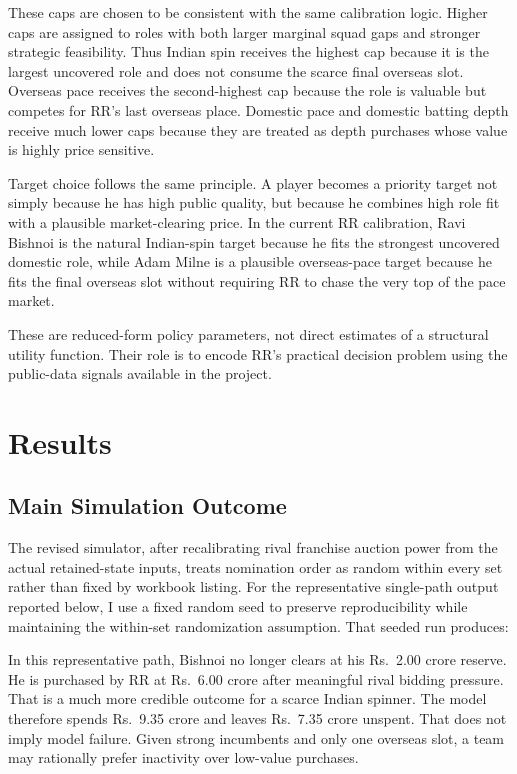 \documentclass[11pt]{article}
\begin{document}
These caps are chosen to be consistent with the same calibration logic. Higher caps are assigned to roles with both larger marginal squad gaps and stronger strategic feasibility. Thus Indian spin receives the highest cap because it is the largest uncovered role and does not consume the scarce final overseas slot. Overseas pace receives the second-highest cap because the role is valuable but competes for RR's last overseas place. Domestic pace and domestic batting depth receive much lower caps because they are treated as depth purchases whose value is highly price sensitive.

Target choice follows the same principle. A player becomes a priority target not simply because he has high public quality, but because he combines high role fit with a plausible market-clearing price. In the current RR calibration, Ravi Bishnoi is the natural Indian-spin target because he fits the strongest uncovered domestic role, while Adam Milne is a plausible overseas-pace target because he fits the final overseas slot without requiring RR to chase the very top of the pace market.

These are reduced-form policy parameters, not direct estimates of a structural utility function. Their role is to encode RR's practical decision problem using the public-data signals available in the project.

\section{Results}

\subsection{Main Simulation Outcome}

The revised simulator, after recalibrating rival franchise auction power from the actual retained-state inputs, treats nomination order as random within every set rather than fixed by workbook listing. For the representative single-path output reported below, I use a fixed random seed to preserve reproducibility while maintaining the within-set randomization assumption. That seeded run produces:



In this representative path, Bishnoi no longer clears at his Rs.\ 2.00 crore reserve. He is purchased by RR at Rs.\ 6.00 crore after meaningful rival bidding pressure. That is a much more credible outcome for a scarce Indian spinner. The model therefore spends Rs.\ 9.35 crore and leaves Rs.\ 7.35 crore unspent. That does not imply model failure. Given strong incumbents and only one overseas slot, a team may rationally prefer inactivity over low-value purchases.
\end{document}
